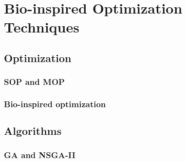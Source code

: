 \section{Bio-inspired Optimization Techniques}
\subsection{Optimization}
\begin{frame}
\frametitle{SOP and MOP}
\end{frame}
\begin{frame}
\frametitle{Bio-inspired optimization}
\end{frame}
\subsection{Algorithms}
\begin{frame}
\frametitle{GA and NSGA-II}
\end{frame}
